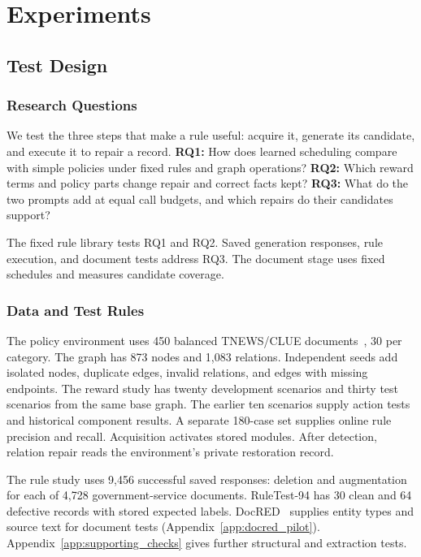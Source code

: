 \section{Experiments}

\label{sec:experiments}

\subsection{Test Design}

\subsubsection{Research Questions}

\label{subsubsec:evaluation_questions}

We test the three steps that make a rule useful: acquire it, generate
its candidate, and execute it to repair a record.
\textbf{RQ1:} How does learned scheduling compare with simple policies
under fixed rules and graph operations?
\textbf{RQ2:} Which reward terms and policy parts change repair and
correct facts kept?
\textbf{RQ3:} What do the two prompts add at equal call budgets,
and which repairs do their candidates support?

The fixed rule library tests RQ1 and RQ2. Saved generation responses,
rule execution, and document tests address RQ3. The document stage uses
fixed schedules and measures candidate coverage.

\subsubsection{Data and Test Rules}

\label{subsubsec:testset}

The policy environment uses 450 balanced TNEWS/CLUE documents~\cite{ref_clue2020}, 30 per
category. The graph has 873 nodes and 1,083 relations. Independent seeds
add isolated nodes, duplicate edges, invalid relations, and edges with
missing endpoints. The reward study has twenty development scenarios
and thirty test scenarios from the same base graph. The earlier ten
scenarios supply action tests and historical component results.
A separate 180-case set supplies online rule precision and recall.
Acquisition activates stored modules. After detection, relation repair
reads the environment's private restoration record.

The rule study uses 9,456 successful saved responses: deletion and
augmentation for each of 4,728 government-service documents.
RuleTest-94 has 30 clean and 64 defective records with stored expected
labels. DocRED~\cite{ref_docred} supplies entity types and source text for document tests
(Appendix~\ref{app:docred_pilot}). Appendix~\ref{app:supporting_checks}
gives further structural and extraction tests.

